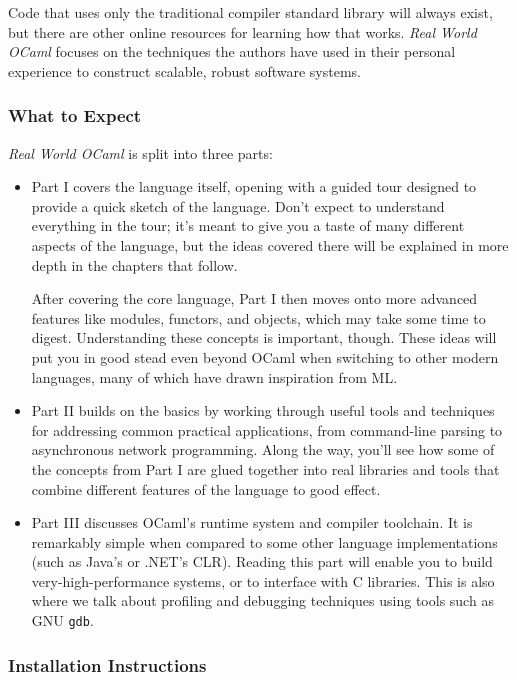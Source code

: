 Code that uses only the traditional compiler standard library will
always exist, but there are other online resources for learning how that
works. \emph{Real World OCaml} focuses on the techniques the authors
have used in their personal experience to construct scalable, robust
software systems.

\hypertarget{what-to-expect}{%
\subsubsection{What to Expect}\label{what-to-expect}}

\emph{Real World OCaml} is split into three parts:

\begin{itemize}
\item
  Part I covers the language itself, opening with a guided tour designed
  to provide a quick sketch of the language. Don't expect to understand
  everything in the tour; it's meant to give you a taste of many
  different aspects of the language, but the ideas covered there will be
  explained in more depth in the chapters that follow.

  After covering the core language, Part I then moves onto more advanced
  features like modules, functors, and objects, which may take some time
  to digest. Understanding these concepts is important, though. These
  ideas will put you in good stead even beyond OCaml when switching to
  other modern languages, many of which have drawn inspiration from ML.
\item
  Part II builds on the basics by working through useful tools and
  techniques for addressing common practical applications, from
  command-line parsing to asynchronous network programming. Along the
  way, you'll see how some of the {concepts} from Part I are glued
  together into real libraries and tools that combine different features
  of the language to good effect.
\item
  Part III discusses OCaml's runtime system and compiler toolchain. It
  is remarkably simple when compared to some other language
  implementations (such as Java's or .NET's CLR). Reading this part will
  enable you to build very-high-performance systems, or to interface
  with C libraries. This is also where we talk about profiling and
  debugging techniques using tools such as GNU
  \passthrough{\lstinline!gdb!}.
\end{itemize}

\hypertarget{installation-instructions}{%
\subsubsection{Installation
Instructions}\label{installation-instructions}}

